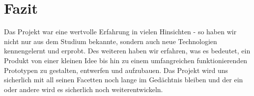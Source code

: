\section{Fazit}
Das Projekt war eine wertvolle Erfahrung in vielen Hinsichten - so haben wir nicht nur aus dem Studium bekannte, sondern auch neue Technologien kennengelernt und erprobt. Des weiteren haben wir erfahren, was es bedeutet, ein Produkt von einer kleinen Idee bis hin zu einem umfangreichen funktionierenden Prototypen zu gestalten, entwerfen und aufzubauen. Das Projekt wird uns sicherlich mit all seinen Facetten noch lange im Gedächtnis bleiben und der ein oder andere wird es sicherlich noch weiterentwickeln.